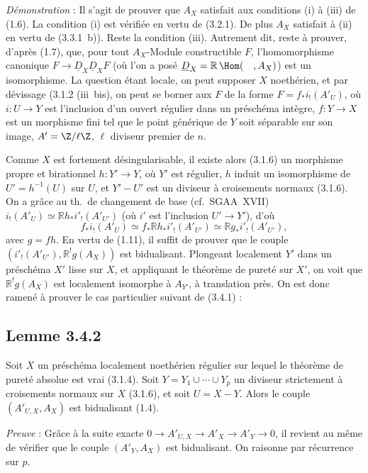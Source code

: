 \emph{Démonstration} : Il s'agit de prouver que $A_X$ satisfait aux conditions (i) à (iii) de (1.6). La condition (i) est vérifiée en vertu de (3.2.1). De plus $A_X$ satisfait à (ii) en vertu de (3.3.1~b)). Reste la condition (iii). Autrement dit, reste à prouver, d'après (1.7), que, pour tout $A_X$-Module constructible $F$, l'homomorphisme canonique $F \to \underline{D}_X \underline{D}_X F$ (où l'on a posé $\underline{D}_X = \mathbb{R}\,\Hom(\quad, A_X)$) est un isomorphisme. La question étant locale, on peut supposer $X$ noethérien, et par dévissage (3.1.2 (iii~bis), on peut se borner aux $F$ de la forme $F = f_{*}i_{!}(A'_U)$, où $i : U \to Y$ est l'inclusion d'un ouvert régulier dans un préschéma intègre, $f : Y \to X$ est un morphisme fini tel que le point générique de $Y$ soit séparable sur son image, $A' = \Z/\ell\Z$, $\ell$ diviseur premier de $n$.

Comme $X$ est fortement désingularisable, il existe alors (3.1.6) un morphisme propre et birationnel $h : Y' \to Y$, où $Y'$ est régulier, $h$ induit un isomorphisme de $U' = h^{-1}(U)$ sur $U$, et $Y' - U'$ est un diviseur à croisements normaux (3.1.6). On a grâce au th.~de changement de base (cf.~SGAA~XVII) $i_{!}(A'_U) \simeq \mathbb{R} h_{*} i'_{!}(A'_{U'})$ (où $i'$ est l'inclusion $U' \to Y'$), d'où
\[
f_{*} i_{!}(A'_U) \simeq f_{*} \mathbb{R} h_{*} i'_{!}(A'_{U'}) \simeq \mathbb{R} g_{*} i'_{!}(A'_{U'}),
\]
avec $g = fh$. En vertu de (1.11), il suffit de prouver que le couple 
$(i'_{!}(A'_{U'}), \mathbb{R}^{!}g(A_X))$ est
bidualisant. Plongeant localement $Y'$ dans un préschéma $X'$ lisse sur $X$, et appliquant le théorème de pureté sur $X'$, on voit que $\mathbb{R}^{!}g(A_X)$ est localement isomorphe à $A_{Y'}$, à translation près. On est donc ramené à prouver le cas particulier suivant de (3.4.1) :

\subsection*{Lemme 3.4.2}
Soit $X$ un préschéma localement noethérien régulier sur lequel le théorème de pureté absolue est vrai (3.1.4). Soit $Y = Y_1 \cup \cdots \cup Y_p$ un diviseur strictement à croisements normaux sur $X$ (3.1.6), et soit $U = X - Y$. Alors le couple $(A'_{U,X}, A_X)$ est bidualisant (1.4).

\emph{Preuve} : Grâce à la suite exacte $0 \to A'_{U,X} \to A'_X \to A'_Y \to 0$, il revient au même de vérifier que le couple $(A'_Y, A_X)$ est bidualisant. On raisonne par récurrence sur $p$.

